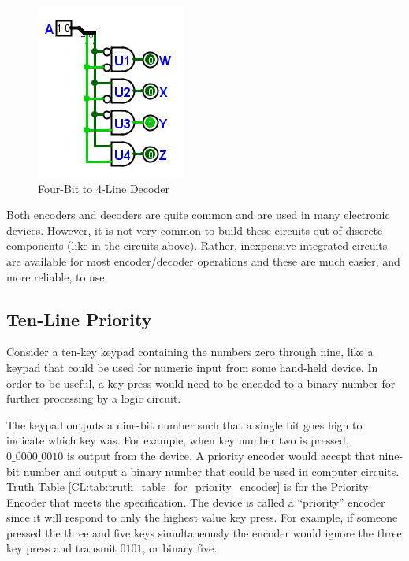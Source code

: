 \begin{figure}[H]
	\centering
	\includegraphics[width=\maxwidth{.95\linewidth}]{gfx/08_15}
	\caption{Four-Bit to 4-Line Decoder}
	\label{fig:08_15}
\end{figure}

Both encoders and decoders are quite common and are used in many electronic devices. However, it is not very common to build these circuits out of discrete components (like in the circuits above). Rather, inexpensive integrated circuits are available for most encoder/decoder operations and these are much easier, and more reliable, to use. 

\subsection{Ten-Line Priority}
\label{CL:subsec:10_line_priority}


Consider a ten-key keypad containing the numbers zero through nine, like a keypad that could be used for numeric input from some hand-held device. In order to be useful, a key press would need to be encoded to a binary number for further processing by a logic circuit. 

The keypad outputs a nine-bit number such that a single bit goes high to indicate which key was. For example, when key number two is pressed, $ 0\_0000\_0010 $ is output from the device. A priority encoder would accept that nine-bit number and output a binary number that could be used in computer circuits. Truth Table \ref{CL:tab:truth_table_for_priority_encoder} is for the Priority Encoder that meets the specification. The device is called a ``priority'' encoder since it will respond to only the highest value key press. For example, if someone pressed the three and five keys simultaneously the encoder would ignore the three key press and transmit $ 0101 $, or binary five.

